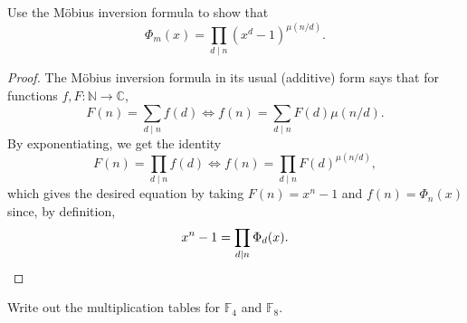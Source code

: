 \documentclass[10pt]{article}
\providecommand{\CC}{\mathbb C}
\providecommand{\FF}{\mathbb F}
\providecommand{\NN}{\mathbb N}
\begin{document}
\begin{problem}
    [\S13.6\#7]
    Use the M\"obius inversion formula to show that
    \begin{equation*}
	\Phi_m(x) = \prod_{d\mid n}(x^d - 1)^{\mu(n/d)}.
    \end{equation*}
\end{problem}

\begin{proof}
    The M\"obius inversion formula in its usual (additive) form says that
    for functions $f,F\colon\NN\to\CC$,
    \begin{equation*}
	F(n) = \sum_{d\mid n}f(d) \iff
	f(n) = \sum_{d\mid n}F(d)\mu(n/d).
    \end{equation*}
    By exponentiating, we get the identity 
    \begin{equation*}
	F(n) = \prod_{d\mid n} f(d)\iff
	f(n) = \prod_{d\mid n} F(d)^{\mu(n/d)},
    \end{equation*}
    which gives the desired equation
    by taking $F(n) = x^n - 1$ and $f(n) = \Phi_n(x)$ since, by definition,
    \begin{equation*}
	x^n - 1 = \prod_{d\mid n}\Phi_d(x).\qedhere
    \end{equation*}
\end{proof}

\pagebreak

\begin{problem}
    [\S14.3\#2]
    Write out the multiplication tables for $\FF_4$ and $\FF_8$.
\end{problem}
\end{document}
